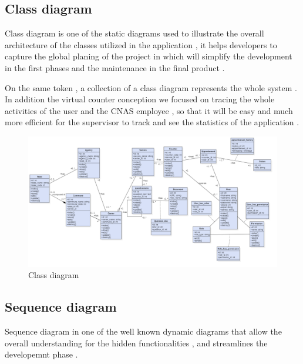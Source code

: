 \subsection{Class diagram}
Class diagram is one of the static diagrams used to illustrate the overall architecture of the classes utilized in the application , it helps developers to capture the global planing of the project in which  will simplify the development in the first phases and the maintenance in the final product . 

\medskip On the same token , a collection of a class diagram represents the whole system . In addition the virtual counter conception we focused on tracing the whole activities of the user and the CNAS employee , so that it will be easy and much more efficient for the supervisor to track and see the statistics of the application . 

\begin{figure}[H]
    \centering
    \includegraphics[width=1.0\textwidth]{ClassDiagram.png}
    \caption{Class diagram}
    \label{fig:Class diagram }
\end{figure}

\subsection{Sequence diagram}
Sequence diagram in one of the well known dynamic diagrams that allow the overall understanding for the hidden functionalities , and streamlines the developemnt phase . 

